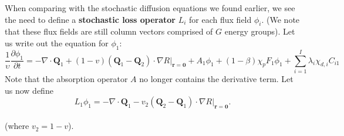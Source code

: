 \documentclass[12pt]{article}
\begin{document}
When comparing with the stochastic diffusion equations we found earlier, we see the need to define a \textbf{stochastic loss operator} $L_i$ for each flux field $\phi_i$. (We note that these flux fields are still column vectors comprised of $G$ energy groups). Let us write out the equation for $\phi_1$:
\begin{equation}
    \frac{1}{\upsilon} \frac{\partial \phi_1}{\partial t}= -\nabla \cdot \mathbf{Q}_1 +(1-v)(\mathbf{Q}_1-\mathbf{Q}_2)\cdot \nabla R|_{\mathbf{r}=\mathbf{0}}+A_1\phi_1 +(1-\beta)\chi_p F_1\phi_1 + \sum_{i=1}^{I}\lambda_i \chi_{d,i}C_{i1}
\end{equation}
Note that the absorption operator $A$ no longer contains the derivative term. Let us now define
\begin{equation}
    L_1 \phi_1=-\nabla \cdot \mathbf{Q}_1 -v_2 (\mathbf{Q}_2-\mathbf{Q}_1)\cdot \nabla R|_{\mathbf{r}=\mathbf{0}}.
\end{equation} \\ 
(where $v_2=1-v$).
\end{document}
